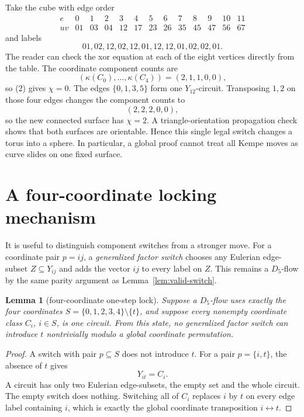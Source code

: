\documentclass[11pt]{article}
\newtheorem{lemma}[theorem]{Lemma}
\theoremstyle{definition}
\theoremstyle{remark}
\newcommand{\kap}{\kappa}
\begin{document}
Take the cube with edge order
\[
\begin{array}{c|rrrrrrrrrrrr}
e&0&1&2&3&4&5&6&7&8&9&10&11\\ \hline
uv&01&03&04&12&17&23&26&35&45&47&56&67
\end{array}
\]
and labels
\[
 01,02,12,02,12,01,12,12,01,02,02,01.                      \tag{8}
\]
The reader can check the xor equation at each of the eight vertices
directly from the table.  The coordinate component counts are
\[
 (\kap(C_0),\ldots,\kap(C_4))=(2,1,1,0,0),
\]
so (2) gives \(\chi=0\).  The edges \(\{0,1,3,5\}\) form one
\(Y_{12}\)-circuit.  Transposing \(1,2\) on those four edges changes the
component counts to
\[
 (2,2,2,0,0),
\]
so the new connected surface has \(\chi=2\).  A triangle-orientation
propagation check shows that both surfaces are orientable.  Hence this
single legal switch changes a torus into a sphere.  In particular, a
global proof cannot treat all Kempe moves as curve slides on one fixed
surface.

\section{A four-coordinate locking mechanism}

It is useful to distinguish component switches from a stronger move.
For a coordinate pair \(p=ij\), a \emph{generalized factor switch}
chooses any Eulerian edge-subset \(Z\subseteq Y_{ij}\) and adds the vector
\(ij\) to every label on \(Z\).  This remains a \(D_5\)-flow by the same
parity argument as Lemma~\ref{lem:valid-switch}.

\begin{lemma}[four-coordinate one-step lock]\label{lem:four-lock}
Suppose a \(D_5\)-flow uses exactly the four coordinates
\(S=\{0,1,2,3,4\}\setminus\{t\}\), and suppose every nonempty coordinate
class \(C_i\), \(i\in S\), is one circuit.  From this state, no generalized
factor switch can introduce \(t\) nontrivially modulo a global coordinate
permutation.
\end{lemma}

\begin{proof}
A switch with pair \(p\subseteq S\) does not introduce \(t\).  For a pair
\(p=\{i,t\}\), the absence of \(t\) gives
\[
 Y_{it}=C_i.
\]
A circuit has only two Eulerian edge-subsets, the empty set and the whole
circuit.  The empty switch does nothing.  Switching all of \(C_i\)
replaces \(i\) by \(t\) on every edge label containing \(i\), which is
exactly the global coordinate transposition \(i\leftrightarrow t\).
\end{proof}
\end{document}
